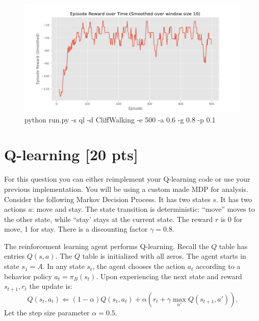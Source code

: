\documentclass[a4paper]{article}
\theoremstyle{definition}
\begin{document}
\begin{figure}[H]
    \centering
    \includegraphics[width=0.8\linewidth]{../3_3.png}
    \caption{python run.py -s ql -d CliffWalking -e 500 -a 0.6 -g 0.8 -p 0.1}
    \label{fig:3_3}
\end{figure}
\section{Q-learning [20 pts]}
For this question you can either reimplement your Q-learning code or use your previous implementation. You will be using a custom made MDP for analysis. Consider the following Markov Decision Process.
It has two states $s$. It has two actions $a$: move and stay. The state transition is deterministic: ``move'' moves to the other state, while ``stay' stays at the current state. The reward $r$ is 0 for move,  1 for stay. There is a discounting factor $\gamma=0.8$.
\\


The reinforcement learning agent performs Q-learning.  Recall the $Q$ table has entries $Q(s,a)$. The $Q$ table is initialized with all zeros. The agent starts in state $s_1=A$. In any state $s_t$, the agent chooses the action $a_t$ according to a behavior policy $a_t = \pi_B(s_t)$. Upon experiencing the next state and reward $s_{t+1}, r_t$ the update is:
$$Q(s_t, a_t) \Leftarrow (1-\alpha) Q(s_t, a_t) + \alpha \left( r_t + \gamma \max_{a'} Q(s_{t+1}, a') \right).$$
Let the step size parameter $\alpha=0.5$.
\end{document}
